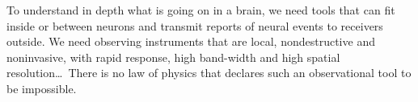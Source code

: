 \renewcommand{\maketitlehookc}{{\small\raggedright Correspondence to: \texttt{adam.h.marblestone\,\textnormal{(at)}\,\,gmail.com}}}


\selectfont
\maketitle
\pagestyle{plain}
\thispagestyle{empty}

\begin{fquote}To understand in depth what is going on in a brain, we need tools that can fit inside or between neurons and transmit reports of neural events to receivers outside. We need observing instruments that are local, nondestructive and noninvasive, with rapid response, high band-width and high spatial resolution\ldots\hfill\ There is no law of physics that declares such an observational tool to be impossible.\end{fquote}

